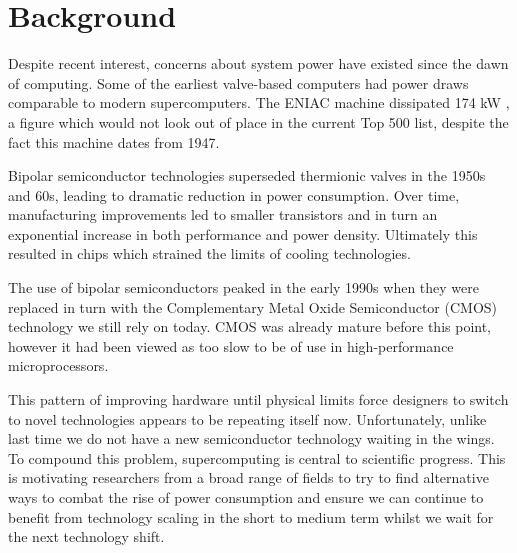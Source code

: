\section{Background}
\label{sec:background}
Despite recent interest, concerns about system power have existed since the dawn of computing. Some of the earliest valve-based computers had power draws comparable to modern supercomputers. The ENIAC machine dissipated 174 kW \cite{todo, book 29/59}, a figure which would not look out of place in the current Top 500 list, despite the fact this machine dates from 1947.

Bipolar semiconductor technologies superseded thermionic valves in the 1950s and 60s, leading to dramatic reduction in power consumption. Over time, manufacturing improvements led to smaller transistors and in turn an exponential increase in both performance and power density. Ultimately this resulted in chips which strained the limits of cooling technologies.

The use of bipolar semiconductors peaked in the early 1990s when they were replaced in turn with the Complementary Metal Oxide Semiconductor (CMOS) technology we still rely on today. CMOS was already mature before this point, however it had been viewed as too slow to be of use in high-performance microprocessors.



This pattern of improving hardware until physical limits force designers to switch to novel technologies appears to be repeating itself now. Unfortunately, unlike last time we do not have a new semiconductor technology waiting in the wings. To compound this problem, supercomputing is  central to scientific progress. This is motivating researchers from a broad range of fields to try to find alternative ways to combat the rise of power consumption and ensure we can continue to benefit from technology scaling in the short to medium term whilst we wait for the next technology shift.




